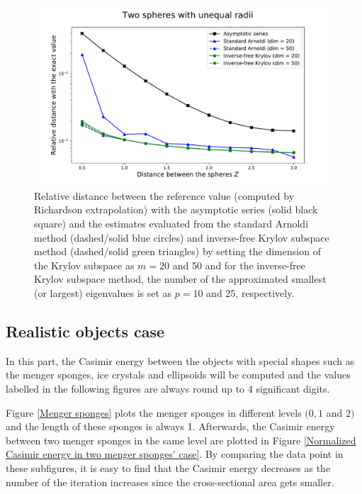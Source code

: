 \begin{figure}[H]
    \includegraphics[scale = 0.7]{figures/relative_distance_unequal_radii.pdf}
    \caption{Relative distance between the reference value (computed by Richardson extrapolation) with the asymptotic series (solid black square)  
    and the estimates evaluated from the standard Arnoldi method (dashed/solid blue circles) and inverse-free Krylov subspace method (dashed/solid green triangles) 
    by setting the dimension of the Krylov subspace as $m = 20$ and 50 and for the inverse-free
    Krylov subspace method, the number of the approximated smallest (or largest) eigenvalues is set as $p = 10$ and 25, respectively.}
    \label{unequal_radii_rel_dist}
\end{figure}

\subsection{Realistic objects case}
In this part, the Casimir energy between the objects with special shapes such as the menger sponges, ice crystals and ellipsoids will be computed and 
the values labelled in the following figures are always round up to 4 significant digits. 

Figure \ref{Menger sponges} plots the menger sponges in different levels $(0, 1 $ and $ 2)$ and the length of these sponges is always 1. Afterwards, the Casimir 
energy between two menger sponges in the same level are plotted in Figure \ref{Normalized Casimir energy in two menger sponges' case}. By comparing the data 
point in these subfigures, it is easy to find that the Casimir energy decreases as the number of the iteration increases since the cross-sectional 
area gets smaller.

